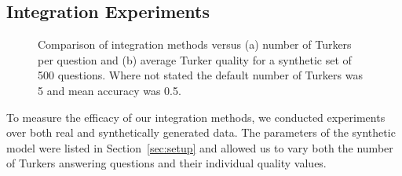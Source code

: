 \subsection{Integration Experiments}
\begin{figure}[t]
	\centering
\hspace{-4mm}
	\caption{Comparison of integration methods versus (a) number of Turkers per question and (b) average Turker quality for a synthetic set of 500 questions.  Where not stated the default number of Turkers was 5 and mean accuracy was 0.5.}
\end{figure}

To measure the efficacy of our integration methods, we conducted experiments over both real and synthetically generated data.  The parameters of the synthetic model were listed in Section~\ref{sec:setup} and allowed us to vary both the number of Turkers answering questions and their individual quality values.

